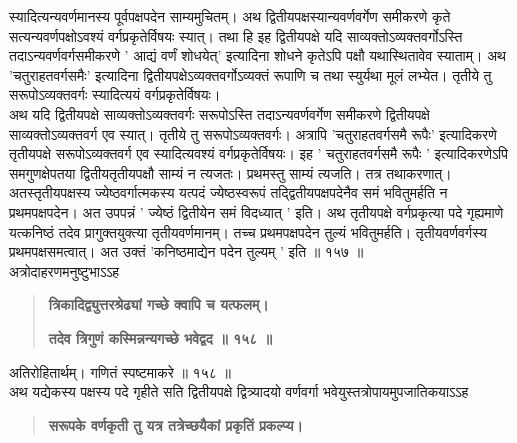 \documentclass[11pt, openany]{book}
\begin{document}
\begin{sloppypar}
\hangindent=0.2in स्यादित्यन्यवर्णमानस्य पूर्वपक्षपदेन साम्यमुचितम्। अथ द्वितीयपक्षस्यान्यवर्णवर्गेण समीकरणे कृते सत्यन्यवर्णपक्षोऽवश्यं वर्गप्रकृतेर्विषयः स्यात्। तथा हि \textendash इह द्वितीयपक्षे यदि साव्यक्तोऽव्यक्तवर्गोऽस्ति तदाऽन्यवर्णवर्गसमीकरणे ' आद्यं वर्णं शोधयेत्' इत्यादिना शोधने कृतेऽपि पक्षौ यथास्थितावेव स्याताम्। अथ 'चतुराहतवर्गसमैः' इत्यादिना द्वितीयपक्षेऽव्यक्तवर्गोऽव्यक्तं रूपाणि च तथा स्युर्यथा मूलं लभ्येत। तृतीये तु सरूपोऽव्यक्तवर्गः स्यादित्ययं वर्गप्रकृतेर्विषयः।\\

\hangindent=0.2in \hspace{0.2in}अथ यदि द्वितीयपक्षे साव्यक्तोऽव्यक्तवर्गः सरूपोऽस्ति तदाऽन्यवर्णवर्गेण समीकरणे द्वितीयपक्षे साव्यक्तोऽव्यक्तवर्ग एव स्यात्। तृतीये तु सरूपोऽव्यक्तवर्गः। अत्रापि 'चतुराहतवर्गसमै रूपैः' इत्यादिकरणे तृतीयपक्षे सरूपोऽव्यक्तवर्ग एव स्यादित्यवश्यं वर्गप्रकृतेर्विषयः। इह ' चतुराहतवर्गसमै रूपैः ' इत्यादिकरणेऽपि समगुणक्षेपतया द्वितीयतृतीयपक्षौ साम्यं न त्यजतः। प्रथमस्तु साम्यं त्यजति। तत्र तथाकरणात्। अतस्तृतीयपक्षस्य ज्येष्ठवर्गात्मकस्य यत्पदं ज्येष्ठस्वरूपं तद्द्वितीयपक्षपदेनैव समं भवितुमर्हति न प्रथमपक्षपदेन। अत उपपन्नं ' ज्येष्ठं द्वितीयेन समं विदध्यात् ' इति। अथ तृतीयपक्षे वर्गप्रकृत्या पदे गृह्यमाणे यत्कनिष्ठं तदेव प्रागुक्तयुक्त्या तृतीयवर्णमानम्। तच्च प्रथमपक्षपदेन तुल्यं भवितुमर्हति। तृतीयवर्णवर्गस्य प्रथमपक्षसमत्वात्। अत उक्तं 'कनिष्ठमाद्येन पदेन तुल्यम् ' इति ॥ १५७ ॥\\

\hangindent=0.2in \hspace{0.2in}अत्रोदाहरणमनुष्टुभाऽऽह\textendash

\begin{quote}
\hspace{1in}\textbf{त्रिकादिद्व्युत्तरश्रेढ्यां गच्छे क्वापि च यत्फलम्।}

\hspace{1in}\textbf{तदेव त्रिगुणं कस्मिन्नन्यगच्छे भवेद्वद ॥ १५८ ॥}
\end{quote}

\hangindent=0.2in \hspace{0.2in}अतिरोहितार्थम्। गणितं स्पष्टमाकरे ॥ १५८ ॥\\

\hangindent=0.2in \hspace{0.2in}अथ यद्येकस्य पक्षस्य पदे गृहीते सति द्वितीयपक्षे द्वित्र्यादयो वर्णवर्गा भवेयुस्तत्रोपायमुपजातिकयाऽऽह\textendash

\begin{quote}
\hspace{1in}\textbf{सरूपके वर्णकृती तु यत्र तत्रेच्छयैकां प्रकृतिं प्रकल्प्य।}


\end{quote}
\end{sloppypar}
\end{document}

